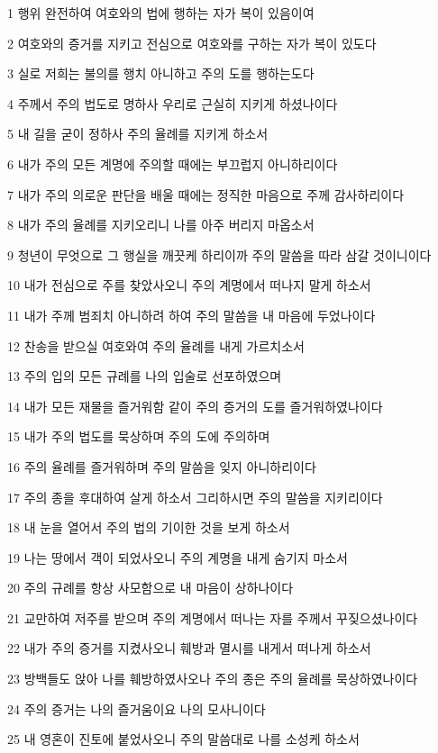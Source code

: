 \par 1 행위 완전하여 여호와의 법에 행하는 자가 복이 있음이여
\par 2 여호와의 증거를 지키고 전심으로 여호와를 구하는 자가 복이 있도다
\par 3 실로 저희는 불의를 행치 아니하고 주의 도를 행하는도다
\par 4 주께서 주의 법도로 명하사 우리로 근실히 지키게 하셨나이다
\par 5 내 길을 굳이 정하사 주의 율례를 지키게 하소서
\par 6 내가 주의 모든 계명에 주의할 때에는 부끄럽지 아니하리이다
\par 7 내가 주의 의로운 판단을 배울 때에는 정직한 마음으로 주께 감사하리이다
\par 8 내가 주의 율례를 지키오리니 나를 아주 버리지 마옵소서
\par 9 청년이 무엇으로 그 행실을 깨끗케 하리이까 주의 말씀을 따라 삼갈 것이니이다
\par 10 내가 전심으로 주를 찾았사오니 주의 계명에서 떠나지 말게 하소서
\par 11 내가 주께 범죄치 아니하려 하여 주의 말씀을 내 마음에 두었나이다
\par 12 찬송을 받으실 여호와여 주의 율례를 내게 가르치소서
\par 13 주의 입의 모든 규례를 나의 입술로 선포하였으며
\par 14 내가 모든 재물을 즐거워함 같이 주의 증거의 도를 즐거워하였나이다
\par 15 내가 주의 법도를 묵상하며 주의 도에 주의하며
\par 16 주의 율례를 즐거워하며 주의 말씀을 잊지 아니하리이다
\par 17 주의 종을 후대하여 살게 하소서 그리하시면 주의 말씀을 지키리이다
\par 18 내 눈을 열어서 주의 법의 기이한 것을 보게 하소서
\par 19 나는 땅에서 객이 되었사오니 주의 계명을 내게 숨기지 마소서
\par 20 주의 규례를 항상 사모함으로 내 마음이 상하나이다
\par 21 교만하여 저주를 받으며 주의 계명에서 떠나는 자를 주께서 꾸짖으셨나이다
\par 22 내가 주의 증거를 지켰사오니 훼방과 멸시를 내게서 떠나게 하소서
\par 23 방백들도 앉아 나를 훼방하였사오나 주의 종은 주의 율례를 묵상하였나이다
\par 24 주의 증거는 나의 즐거움이요 나의 모사니이다
\par 25 내 영혼이 진토에 붙었사오니 주의 말씀대로 나를 소성케 하소서
